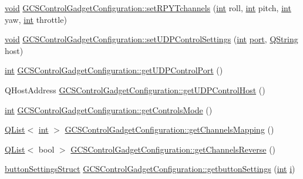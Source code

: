\begin{DoxyCompactItemize}
\item 
\hyperlink{group___u_a_v_objects_plugin_ga444cf2ff3f0ecbe028adce838d373f5c}{void} \hyperlink{group___g_c_s_control_gadget_plugin_ga60a55663d33c0fa8ede8a318f08fc639}{G\-C\-S\-Control\-Gadget\-Configuration\-::set\-R\-P\-Y\-Tchannels} (\hyperlink{ioapi_8h_a787fa3cf048117ba7123753c1e74fcd6}{int} roll, \hyperlink{ioapi_8h_a787fa3cf048117ba7123753c1e74fcd6}{int} pitch, \hyperlink{ioapi_8h_a787fa3cf048117ba7123753c1e74fcd6}{int} yaw, \hyperlink{ioapi_8h_a787fa3cf048117ba7123753c1e74fcd6}{int} throttle)
\item 
\hyperlink{group___u_a_v_objects_plugin_ga444cf2ff3f0ecbe028adce838d373f5c}{void} \hyperlink{group___g_c_s_control_gadget_plugin_ga3bcc78712b1d750a1426bd1342f0897a}{G\-C\-S\-Control\-Gadget\-Configuration\-::set\-U\-D\-P\-Control\-Settings} (\hyperlink{ioapi_8h_a787fa3cf048117ba7123753c1e74fcd6}{int} \hyperlink{classport}{port}, \hyperlink{group___u_a_v_objects_plugin_gab9d252f49c333c94a72f97ce3105a32d}{Q\-String} host)
\item 
\hyperlink{ioapi_8h_a787fa3cf048117ba7123753c1e74fcd6}{int} \hyperlink{group___g_c_s_control_gadget_plugin_gab4759362f125b28eca65edb170d6d179}{G\-C\-S\-Control\-Gadget\-Configuration\-::get\-U\-D\-P\-Control\-Port} ()
\item 
Q\-Host\-Address \hyperlink{group___g_c_s_control_gadget_plugin_ga3d756308c4f352759b919076507be2de}{G\-C\-S\-Control\-Gadget\-Configuration\-::get\-U\-D\-P\-Control\-Host} ()
\item 
\hyperlink{ioapi_8h_a787fa3cf048117ba7123753c1e74fcd6}{int} \hyperlink{group___g_c_s_control_gadget_plugin_ga4604101049b278a5e919fa1bcbba4a74}{G\-C\-S\-Control\-Gadget\-Configuration\-::get\-Controls\-Mode} ()
\item 
\hyperlink{class_q_list}{Q\-List}$<$ \hyperlink{ioapi_8h_a787fa3cf048117ba7123753c1e74fcd6}{int} $>$ \hyperlink{group___g_c_s_control_gadget_plugin_gad8ea955332edf856259dc191fdca5473}{G\-C\-S\-Control\-Gadget\-Configuration\-::get\-Channels\-Mapping} ()
\item 
\hyperlink{class_q_list}{Q\-List}$<$ bool $>$ \hyperlink{group___g_c_s_control_gadget_plugin_ga643521630f66ed868de507d649278971}{G\-C\-S\-Control\-Gadget\-Configuration\-::get\-Channels\-Reverse} ()
\item 
\hyperlink{structbutton_settings_struct}{button\-Settings\-Struct} \hyperlink{group___g_c_s_control_gadget_plugin_ga024292274c2307cd9e45e6a7fbbba208}{G\-C\-S\-Control\-Gadget\-Configuration\-::getbutton\-Settings} (\hyperlink{ioapi_8h_a787fa3cf048117ba7123753c1e74fcd6}{int} \hyperlink{uavobjecttemplate_8m_a6f6ccfcf58b31cb6412107d9d5281426}{i})

\end{DoxyCompactItemize}
